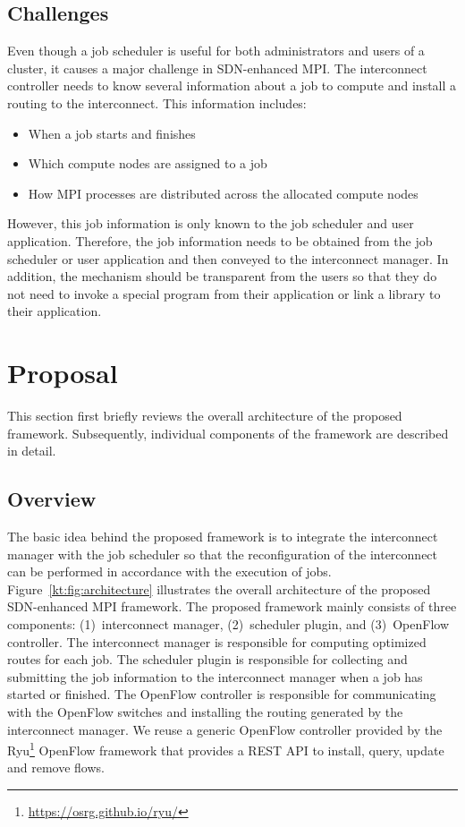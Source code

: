 \documentclass[graybox]{svmult}
\begin{document}
\subsection{Challenges}

Even though a job scheduler is useful for both administrators and users of a
cluster, it causes a major challenge in SDN-enhanced MPI\@. The interconnect
controller needs to know several information about a job to compute and
install a routing to the interconnect. This information includes:

\begin{itemize}
    \item When a job starts and finishes
    \item Which compute nodes are assigned to a job
    \item How MPI processes are distributed across the allocated compute nodes
\end{itemize}

However, this job information is only known to the job scheduler and user
application. Therefore, the job information needs to be obtained from the job
scheduler or user application and then conveyed to the interconnect manager.
In addition, the mechanism should be transparent from the users so that they
do not need to invoke a special program from their application or link a
library to their application.

\section{Proposal}\label{kt:sec:iii}

This section first briefly reviews the overall architecture of the proposed
framework. Subsequently, individual components of the framework are described
in detail.

\subsection{Overview}

The basic idea behind the proposed framework is to integrate the interconnect
manager with the job scheduler so that the reconfiguration of the interconnect
can be performed in accordance with the execution of jobs.
Figure~\ref{kt:fig:architecture} illustrates the overall architecture of the
proposed SDN-enhanced MPI framework. The proposed framework mainly consists of
three components: (1)~interconnect manager, (2)~scheduler plugin, and
(3)~OpenFlow controller. The interconnect manager is responsible for computing
optimized routes  for each job. The scheduler plugin is responsible for
collecting and submitting the job information to the interconnect manager when
a job has started or finished. The OpenFlow controller is responsible for
communicating with the OpenFlow switches and installing the routing generated
by the interconnect manager. We reuse a generic OpenFlow controller provided
by the Ryu\footnote{\url{https://osrg.github.io/ryu/}} OpenFlow framework that
provides a REST API to install, query, update and remove flows.
\end{document}
